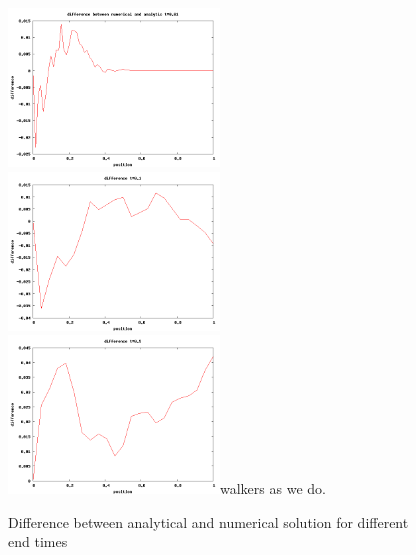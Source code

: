 \documentclass[a4wide,12pt]{article}
\begin{document}
\begin{figure}[p]
 \includegraphics[width=0.5\textwidth]{difference1d001}
 \includegraphics[width=0.5\textwidth]{difference01}
 \includegraphics[width=0.5\textwidth]{difference05}walkers as we do. 
 \caption{Difference between analytical and numerical solution for different end times}
 \label{fig:02}
\end{figure}
 
\end{document}
